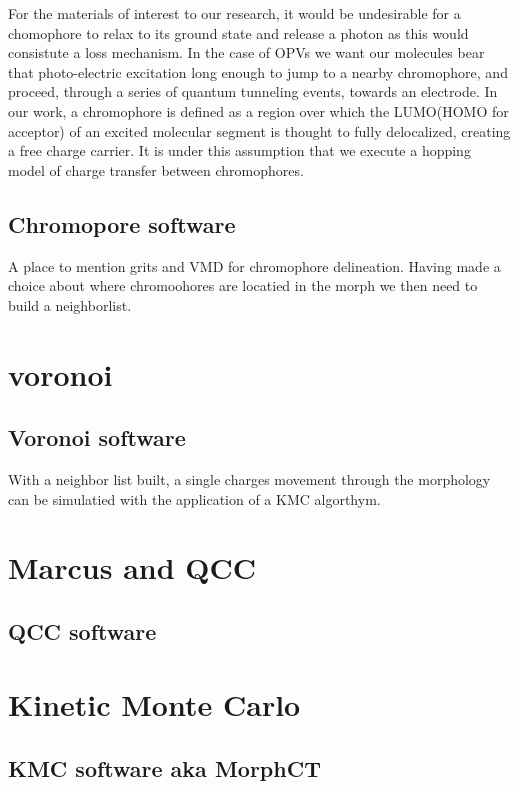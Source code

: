 For the materials of interest to our research, it would be undesirable for a chomophore to relax to its ground
state and release a photon as this would consistute a loss mechanism. In the case of
OPVs we want our molecules bear that photo-electric
excitation long enough to jump to a nearby chromophore, and proceed, through a
series of quantum tunneling events, towards an electrode. 
In our work, a chromophore is defined as a region over which the
LUMO(HOMO for acceptor) of an excited molecular segment is thought to fully delocalized, creating a free
charge carrier. It is under this assumption that we execute a hopping model of charge transfer between
chromophores.  

    \subsection{Chromopore software}

A place to mention grits and VMD for chromophore delineation. Having made a choice about where chromoohores
are locatied in the morph we then need to build a neighborlist. 
\section{voronoi}

    \subsection{Voronoi software}

With a neighbor list built, a single charges movement through the morphology can be simulatied with the
application of a KMC algorthym.

\section{Marcus and QCC}

    \subsection{QCC software}

\section{Kinetic Monte Carlo}

    \subsection{KMC software aka MorphCT}

